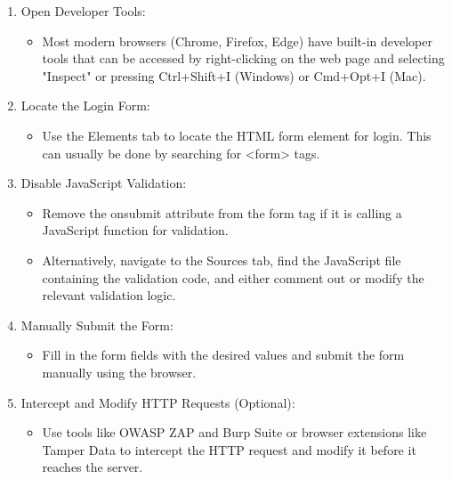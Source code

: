 \begin{enumerate}
    \item Open Developer Tools:
        \begin{itemize}
            \item Most modern browsers (Chrome, Firefox, Edge) have built-in developer tools that can be accessed by right-clicking on the web page and selecting "Inspect" or pressing Ctrl+Shift+I (Windows) or Cmd+Opt+I (Mac).
        \end{itemize}
    \item Locate the Login Form:
        \begin{itemize}
            \item Use the Elements tab to locate the HTML form element for login. This can usually be done by searching for <form> tags.
        \end{itemize}
    \item Disable JavaScript Validation:
        \begin{itemize}
            \item Remove the onsubmit attribute from the form tag if it is calling a JavaScript function for validation.
            \item Alternatively, navigate to the Sources tab, find the JavaScript file containing the validation code, and either comment out or modify the relevant validation logic.
        \end{itemize}
    \item Manually Submit the Form:
        \begin{itemize}
            \item Fill in the form fields with the desired values and submit the form manually using the browser.
        \end{itemize}
    \item Intercept and Modify HTTP Requests (Optional):
        \begin{itemize}
            \item Use tools like OWASP ZAP and Burp Suite or browser extensions like Tamper Data to intercept the HTTP request and modify it before it reaches the server.
        \end{itemize}
\end{enumerate}

